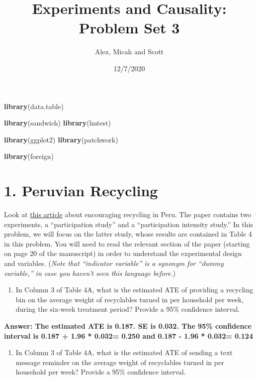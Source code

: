 \documentclass[
]{article}
\title{Experiments and Causality: Problem Set 3}
\author{Alex, Micah and Scott}
\date{12/7/2020}
\newenvironment{Shaded}{\begin{snugshade}}{\end{snugshade}}
\newcommand{\KeywordTok}[1]{\textcolor[rgb]{0.13,0.29,0.53}{\textbf{#1}}}
\newcommand{\NormalTok}[1]{#1}
\providecommand{\tightlist}{%
  \setlength{\itemsep}{0pt}\setlength{\parskip}{0pt}}
\begin{document}
\maketitle

\begin{Shaded}
\begin{Highlighting}[]
\KeywordTok{library}\NormalTok{(data.table)}

\KeywordTok{library}\NormalTok{(sandwich)}
\KeywordTok{library}\NormalTok{(lmtest)}

\KeywordTok{library}\NormalTok{(ggplot2)}
\KeywordTok{library}\NormalTok{(patchwork)}

\KeywordTok{library}\NormalTok{(foreign)}
\end{Highlighting}
\end{Shaded}

\hypertarget{peruvian-recycling}{%
\section{1. Peruvian Recycling}\label{peruvian-recycling}}

Look at \href{./readings/recycling_peru.pdf}{this article} about
encouraging recycling in Peru. The paper contains two experiments, a
``participation study'' and a ``participation intensity study.'' In this
problem, we will focus on the latter study, whose results are contained
in Table 4 in this problem. You will need to read the relevant section
of the paper (starting on page 20 of the manuscript) in order to
understand the experimental design and variables. (\emph{Note that
``indicator variable'' is a synonym for ``dummy variable,'' in case you
haven't seen this language before.})

\begin{enumerate}
\def\labelenumi{\arabic{enumi}.}
\tightlist
\item
  In Column 3 of Table 4A, what is the estimated ATE of providing a
  recycling bin on the average weight of recyclables turned in per
  household per week, during the six-week treatment period? Provide a
  95\% confidence interval.
\end{enumerate}

\textbf{Answer: The estimated ATE is 0.187. SE is 0.032. The 95\%
confidence interval is 0.187 + 1.96 * 0.032= 0.250 and 0.187 - 1.96 *
0.032= 0.124}

\begin{enumerate}
\def\labelenumi{\arabic{enumi}.}
\setcounter{enumi}{1}
\tightlist
\item
  In Column 3 of Table 4A, what is the estimated ATE of sending a text
  message reminder on the average weight of recyclables turned in per
  household per week? Provide a 95\% confidence interval.
\end{enumerate}
\end{document}
